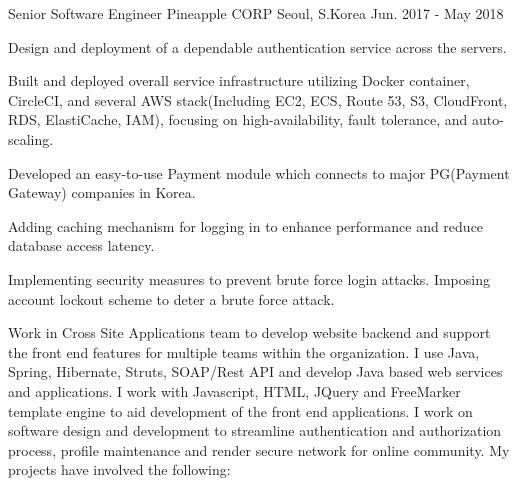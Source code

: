 

\begin{cventries}

  \cventry
    {Senior Software Engineer} %
    {Pineapple CORP} %
    {Seoul, S.Korea} %
    {Jun. 2017 - May 2018} %
    {
      \begin{cvitems} %
        \item {Design and deployment of a dependable authentication service across the servers.}
        \item {Built and deployed overall service infrastructure utilizing Docker container, CircleCI, and several AWS stack(Including EC2, ECS, Route 53, S3, CloudFront, RDS, ElastiCache, IAM), focusing on high-availability, fault tolerance, and auto-scaling.}
        \item {Developed an easy-to-use Payment module which connects to major PG(Payment Gateway) companies in Korea.}
        \item {Adding caching mechanism for logging in to enhance performance and reduce database access latency.}
        \item {Implementing security measures to prevent brute force login attacks. Imposing account lockout scheme to deter a brute force attack.}
      \end{cvitems}
    }
    {
      \begin{cventrysummary} %
        Work in Cross Site Applications team to develop website backend and support the front end features for multiple teams within the organization. I use Java, Spring, Hibernate, Struts, SOAP/Rest API and develop Java based web services and applications. I work with Javascript, HTML, JQuery and FreeMarker template engine to aid development of the front end applications. I work on software design and development to streamline authentication and authorization process, profile maintenance and render secure network for online community. My projects have involved the following:
      \end{cventrysummary}
    }


\end{cventries}
